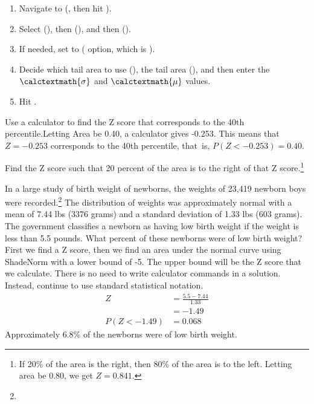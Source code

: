 \begin{termBox}{
\begin{enumerate}
\setlength{\itemsep}{0mm}
\setlength{\itemsep}{0mm}
\item Navigate to  (, then hit ).
\item Select  (), then  (), and then  ().
\item If needed, set  to  ( option, which is ).
\item Decide which tail area to use (), the tail area (), and then enter the $\calctextmath{\sigma}$ and $\calctextmath{\mu}$ values.
\item Hit .
\end{enumerate}
}
\end{termBox}

\begin{example}{Use a calculator to find the Z score that corresponds to the 40th percentile.}Letting Area be 0.40, a calculator gives -0.253. This means that $Z = -0.253$ corresponds to the 40th percentile, that~is, $P(Z < -0.253) = 0.40$.
\end{example}

\begin{exercise}Find the Z score such that 20 percent of the area is to the right of that Z score.\footnote{If 20\% of the area is the right, then 80\% of the area is to the left. Letting area be 0.80, we get $Z = 0.841$.}
\end{exercise}	

\begin{example}{In a large study of birth weight of newborns, the weights of 23,419 newborn boys were recorded.\footnote{} The distribution of weights was approximately normal with a mean of 7.44 lbs (3376 grams) and a standard deviation of 1.33 lbs (603 grams). The government classifies a newborn as having low birth weight if the weight is less than 5.5 pounds. What percent of these newborns were of low birth weight?}
First we find a Z score, then we find an area under the normal curve using ShadeNorm with a lower bound of -5. The upper bound will be the Z score that we calculate. There is no need to write calculator commands in a solution. Instead, continue to use standard statistical notation. 
\begin{align*}
Z&=\frac{5.5-7.44}{1.33}\\
&=-1.49\\
P(Z < -1.49) &= 0.068
\end{align*}
Approximately 6.8\% of the newborns were of low birth weight.
\end{example}

